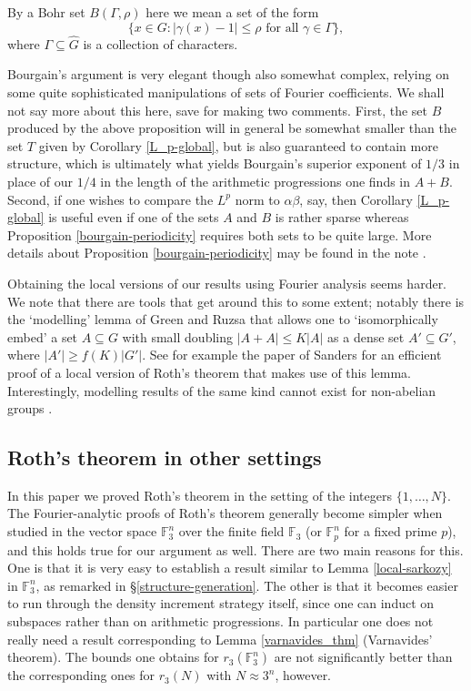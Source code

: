 \documentclass[12pt,a4paper,reqno]{amsart}
\numberwithin{equation}{section}
\theoremstyle{plain}
\theoremstyle{definition}
\renewcommand{\leq}{\leqslant}
\renewcommand{\geq}{\geqslant}
\renewcommand{\subset}{\subseteq}
\def\F{\mathbb{F}}
\begin{document}
By a Bohr set $B(\Gamma, \rho)$ here we mean a set of the form 
\[ \{ x \in G : |\gamma(x)-1| \leq \rho \text{ for all $\gamma \in \Gamma$} \}, \]
where $\Gamma \subset \widehat{G}$ is a collection of characters.

Bourgain's argument is very elegant though also somewhat complex, relying on some quite sophisticated manipulations of sets of Fourier coefficients. We shall not say more about this here, save for making two comments. First, the set $B$ produced by the above proposition will in general be somewhat smaller than the set $T$ given by Corollary \ref{L_p-global}, but is also guaranteed to contain more structure, which is ultimately what yields Bourgain's superior exponent of $1/3$ in place of our $1/4$ in the length of the arithmetic progressions one finds in $A+B$. Second, if one wishes to compare the $L^p$ norm to $\alpha \beta$, say, then Corollary \ref{L_p-global} is useful even if one of the sets $A$ and $B$ is rather sparse whereas Proposition \ref{bourgain-periodicity} requires both sets to be quite large. More details about Proposition \ref{bourgain-periodicity} may be found in the note \cite{sisask:bourgain-APs}.

Obtaining the local versions of our results using Fourier analysis seems harder. We note that there are tools that get around this to some extent; notably there is the `modelling' lemma of Green and Ruzsa \cite{green-ruzsa:freiman} that allows one to `isomorphically embed' a set $A \subset G$ with small doubling $|A+A| \leq K|A|$ as a dense set $A' \subset G'$, where $|A'| \geq f(K) |G'|$. See for example the paper \cite{sanders:local-roth} of Sanders for an efficient proof of a local version of Roth's theorem that makes use of this lemma. Interestingly, modelling results of the same kind cannot exist for non-abelian groups \cite{tao:no-finite-models}.

\subsection{Roth's theorem in other settings}
In this paper we proved Roth's theorem in the setting of the integers $\{1, \ldots, N\}$. The Fourier-analytic proofs of Roth's theorem generally become simpler when studied in the vector space $\F_3^n$ over the finite field $\F_3$ (or $\F_p^n$ for a fixed prime $p$), and this holds true for our argument as well. There are two main reasons for this. One is that it is very easy to establish a result similar to Lemma \ref{local-sarkozy} in $\F_3^n$, as remarked in \S\ref{structure-generation}. The other is that it becomes easier to run through the density increment strategy itself, since one can induct on subspaces rather than on arithmetic progressions. In particular one does not really need a result corresponding to Lemma \ref{varnavides_thm} (Varnavides' theorem). The bounds one obtains for $r_3(\F_3^n)$ are not significantly better than the corresponding ones for $r_3(N)$ with $N \approx 3^n$, however.
\end{document}
